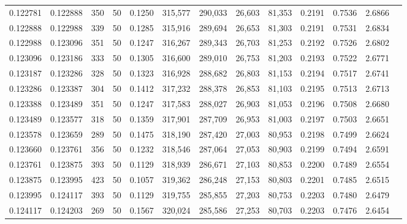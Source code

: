 \begin{tabular}{rrrrrrrrrrrrr}
0.122781 & 0.122888 &   350 &  50 &                                     0.1250 & 315,577 & 290,033 &  26,603 &  81,353 & 0.2191 & 0.7536 & 2.6866 \\
0.122888 & 0.122988 &   339 &  50 &                                     0.1285 & 315,916 & 289,694 &  26,653 &  81,303 & 0.2191 & 0.7531 & 2.6834 \\
0.122988 & 0.123096 &   351 &  50 &                                     0.1247 & 316,267 & 289,343 &  26,703 &  81,253 & 0.2192 & 0.7526 & 2.6802 \\
0.123096 & 0.123186 &   333 &  50 &                                     0.1305 & 316,600 & 289,010 &  26,753 &  81,203 & 0.2193 & 0.7522 & 2.6771 \\
0.123187 & 0.123286 &   328 &  50 &                                     0.1323 & 316,928 & 288,682 &  26,803 &  81,153 & 0.2194 & 0.7517 & 2.6741 \\
0.123286 & 0.123387 &   304 &  50 &                                     0.1412 & 317,232 & 288,378 &  26,853 &  81,103 & 0.2195 & 0.7513 & 2.6713 \\
0.123388 & 0.123489 &   351 &  50 &                                     0.1247 & 317,583 & 288,027 &  26,903 &  81,053 & 0.2196 & 0.7508 & 2.6680 \\
0.123489 & 0.123577 &   318 &  50 &                                     0.1359 & 317,901 & 287,709 &  26,953 &  81,003 & 0.2197 & 0.7503 & 2.6651 \\
0.123578 & 0.123659 &   289 &  50 &                                     0.1475 & 318,190 & 287,420 &  27,003 &  80,953 & 0.2198 & 0.7499 & 2.6624 \\
0.123660 & 0.123761 &   356 &  50 &                                     0.1232 & 318,546 & 287,064 &  27,053 &  80,903 & 0.2199 & 0.7494 & 2.6591 \\
0.123761 & 0.123875 &   393 &  50 &                                     0.1129 & 318,939 & 286,671 &  27,103 &  80,853 & 0.2200 & 0.7489 & 2.6554 \\
0.123875 & 0.123995 &   423 &  50 &                                     0.1057 & 319,362 & 286,248 &  27,153 &  80,803 & 0.2201 & 0.7485 & 2.6515 \\
0.123995 & 0.124117 &   393 &  50 &                                     0.1129 & 319,755 & 285,855 &  27,203 &  80,753 & 0.2203 & 0.7480 & 2.6479 \\
0.124117 & 0.124203 &   269 &  50 &                                     0.1567 & 320,024 & 285,586 &  27,253 &  80,703 & 0.2203 & 0.7476 & 2.6454 \\

\end{tabular}
